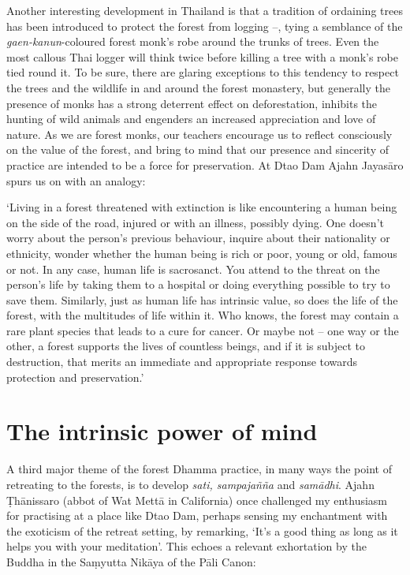 Another interesting development in Thailand is that a tradition of
ordaining trees has been introduced to protect the forest from logging
--, tying a semblance of the \emph{gaen-kanun}-coloured forest monk's
robe around the trunks of trees. Even the most callous Thai logger will
think twice before killing a tree with a monk's robe tied round it. To
be sure, there are glaring exceptions to this tendency to respect the
trees and the wildlife in and around the forest monastery, but generally
the presence of monks has a strong deterrent effect on deforestation, 
inhibits the hunting of wild animals and engenders an increased
appreciation and love of nature. As we are forest monks, our
teachers encourage us to reflect consciously on the value of the forest, 
and bring to mind that our presence and sincerity of practice are
intended to be a force for preservation. At Dtao Dam Ajahn Jayasāro
spurs us on with an analogy: 

`Living in a forest threatened with extinction is like encountering a
human being on the side of the road, injured or with an illness, 
possibly dying. One doesn't worry about the person's previous behaviour, 
inquire about their nationality or ethnicity, wonder whether the human
being is rich or poor, young or old, famous or not. In any case, human
life is sacrosanct. You attend to the threat on the person's life by
taking them to a hospital or doing everything possible to try to save
them. Similarly, just as human life has intrinsic value, so does the
life of the forest, with the multitudes of life within it. Who knows, 
the forest may contain a rare plant species that leads to a cure for
cancer. Or maybe not -- one way or the other, a forest supports the
lives of countless beings, and if it is subject to destruction, that
merits an immediate and appropriate response towards protection and
preservation.'

\section{The intrinsic power of mind}

A third major theme of the forest Dhamma practice, in many ways the
point of retreating to the forests, is to develop \emph{sati, 
sampajañña} and \emph{samādhi}. Ajahn Ṭhānissaro (abbot of Wat Mettā in
California) once challenged my enthusiasm for practising at a place like
Dtao Dam, perhaps sensing my enchantment with the exoticism of the
retreat setting, by remarking, `It's a good thing as long as it helps
you with your meditation'. This echoes a relevant exhortation by the
Buddha in the Saṃyutta Nikāya of the Pāli Canon:

